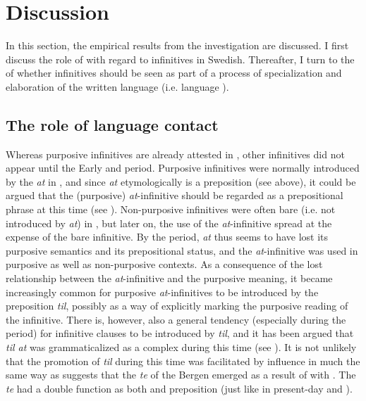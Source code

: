 \documentclass[output=paper]{langscibook}
\begin{document}
\section{Discussion}\label{sec:kalm:5}

In this section, the empirical results from the investigation are discussed. I first discuss the role of  with regard to  infinitives in Swedish. Thereafter, I turn to the  of whether  infinitives should be seen as part of a process of specialization and elaboration of the written language (i.e. language ). 


\subsection{The role of language contact}\label{sec:kalm:5.1}

Whereas purposive infinitives are already attested in , other  infinitives did not appear until the Early and  period. Purposive infinitives were normally introduced by the  \textit{at} in , and since \textit{at} etymologically is a preposition (see  above), it could be argued that the (purposive) \textit{at}{}-infinitive should be regarded as a prepositional phrase at this time (see \citealt{Kalm2016Satsekvivalenta}). Non-purposive infinitives were often bare (i.e. not introduced by \textit{at}) in , but later on, the use of the \textit{at}{}-infinitive spread at the expense of the bare infinitive. By the  period, \textit{at} thus seems to have lost its purposive semantics and its prepositional status, and the \textit{at}{}-infinitive was used in purposive as well as non-purposive contexts. As a consequence of the lost relationship between the \textit{at}{}-infinitive and the purposive meaning, it became increasingly common for purposive \textit{at}{}-infinitives to be introduced by the preposition \textit{til}, possibly as a way of explicitly marking the purposive reading of the infinitive. There is, however, also a general tendency (especially during the  period) for infinitive clauses to be introduced by \textit{til}, and it has been argued that \textit{til at} was grammaticalized as a complex  during this time (see \citealt{Kalm2014,Kalm2016Satsekvivalenta}). It is not unlikely that the promotion of \textit{til} during this time was facilitated by  influence in much the same way as \citet{Nesse2002} suggests that the  \textit{te} of the  Bergen  emerged as a result of  with . The  \textit{te} had a double function as both  and preposition (just like in present-day  and ).
\end{document}
